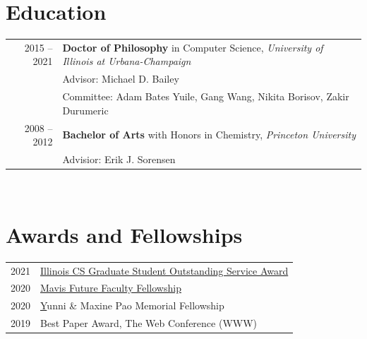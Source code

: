 \documentclass[10pt,singlecolumn]{article} %
\begin{document}

\section{Education} 

\begin{tabular}{rl} %


2015 -- 2021 & \textbf{Doctor of Philosophy} in Computer Science, \emph{University of Illinois at Urbana-Champaign}\\ 
& Advisor: Michael D. Bailey \\
& Committee: Adam Bates Yuile, Gang Wang, Nikita Borisov, Zakir Durumeric \\
	 

2008 -- 2012 & \textbf{Bachelor of Arts} with Honors in Chemistry,  \emph{Princeton University}\\
& Advisior: Erik J. Sorensen \\
	  
\end{tabular} \\


\section{Awards and Fellowships} 

\begin{tabular}{rl}

2021 & \href{https://cs.illinois.edu/about/awards/graduate-fellowships-awards/graduate-student-outstanding-service-award}{Illinois CS Graduate Student Outstanding Service Award} \\ 

2020 & \href{https://mavis.grainger.illinois.edu/}{Mavis Future Faculty Fellowship} \\

2020 & \href{https://cs.illinois.edu/about/awards/graduate-fellowships-awards/yunni-and-maxine-pao-memorial-fellowship} Yunni \& Maxine Pao Memorial Fellowship \\

2019 & Best Paper Award, The Web Conference (WWW) \\
\end{tabular}\\
\end{document}
